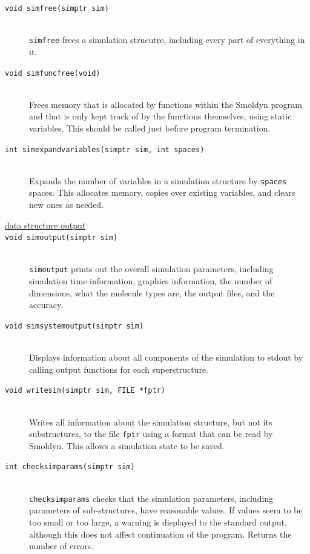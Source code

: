 \documentclass {scrbook}
\newcommand {\ttt} {\texttt}
\begin{document}
\begin{description}
\item[\ttt{void simfree(simptr sim)}]
\hfill \\
\ttt{simfree} frees a simulation strucutre, including every part of everything in it.

\item[\ttt{void simfuncfree(void)}]
\hfill \\
Frees memory that is allocated by functions within the Smoldyn program and that is only kept track of by the functions themselves, using static variables. This should be called just before program termination.

\item[\ttt{int simexpandvariables(simptr sim, int spaces)}]
\hfill \\
Expands the number of variables in a simulation structure by \ttt{spaces} spaces. This allocates memory, copies over existing variables, and clears new ones as needed.

\item[\underline{data structure output}]

\item[\ttt{void simoutput(simptr sim)}]
\hfill \\
\ttt{simoutput} prints out the overall simulation parameters, including simulation time information, graphics information, the number of dimensions, what the molecule types are, the output files, and the accuracy.

\item[\ttt{void simsystemoutput(simptr sim)}]
\hfill \\
Displays information about all components of the simulation to stdout by calling output functions for each superstructure.

\item[\ttt{void writesim(simptr sim, FILE *fptr)}]
\hfill \\
Writes all information about the simulation structure, but not its substructures, to the file \ttt{fptr} using a format that can be read by Smoldyn. This allows a simulation state to be saved.

\item[\ttt{int checksimparams(simptr sim)}]
\hfill \\
\ttt{checksimparams} checks that the simulation parameters, including parameters of sub-structures, have reasonable values. If values seem to be too small or too large, a warning is displayed to the standard output, although this does not affect continuation of the program. Returns the number of errors.


\end{description}
\end{document}
